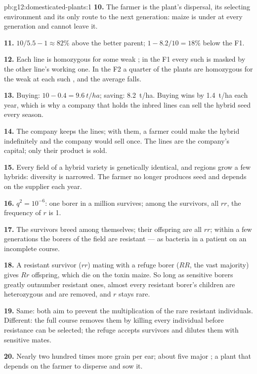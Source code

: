 \begin{solution}{pb:g12:domesticated-plants:1}
\textbf{10.} The farmer is the plant's dispersal, its selecting
environment and its only route to the next generation: maize is under
 at every generation and cannot leave it.

\textbf{11.} $10/5.5 - 1 \approx 82\%$ above the better parent;
$1 - 8.2/10 = 18\%$ below the F1.

\textbf{12.} Each line is homozygous for some weak  ;
in the F1 every such  is masked by the other line's working one.
In the F2 a quarter of the plants are homozygous for the weak 
at each such , and the average falls.

\textbf{13.} Buying: $10 - 0.4 = \qty{9.6}{t/ha}$; saving: \qty{8.2}{t/ha}.
Buying wins by \qty{1.4}{t/ha} each year, which is why a company that
holds the inbred lines can sell the hybrid seed every season.

\textbf{14.} The company keeps the lines; with them, a farmer could
make the hybrid indefinitely and the company would sell once. The
lines are the company's capital; only their product is sold.

\textbf{15.} Every field of a hybrid variety is genetically identical,
and regions grow a few hybrids: diversity is narrowed. The farmer no
longer produces seed and depends on the supplier each year.

\textbf{16.} $q^2 = 10^{-6}$: one borer in a million survives; among
the survivors, all $rr$, the frequency of $r$ is 1.

\textbf{17.} The survivors breed among themselves; their offspring are
all $rr$; within a few generations the borers of the field are
resistant --- as bacteria in a patient on an incomplete course.

\textbf{18.} A resistant survivor ($rr$) mating with a refuge borer
($RR$, the vast majority) gives $Rr$ offspring, which die on the toxin
maize. So long as sensitive borers greatly outnumber resistant ones,
almost every resistant borer's children are heterozygous and are
removed, and $r$ stays rare.

\textbf{19.} Same: both aim to prevent the multiplication of the rare
resistant individuals. Different: the full course removes them by
killing every individual before resistance can be selected; the refuge
accepts survivors and dilutes them with sensitive mates.

\textbf{20.} Nearly two hundred times more grain per ear; about five
major ; a plant that depends on the farmer to disperse and sow
it.
\end{solution}
